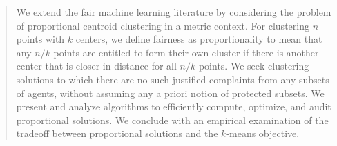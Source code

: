 \documentclass{article}
\begin{document}
\maketitle

\begin{abstract}We extend the fair machine learning literature by considering the problem of proportional centroid clustering in a metric context. For clustering $n$ points with $k$ centers, we define fairness as proportionality to mean that any $n/k$ points are entitled to form their own cluster if there is another center that is closer in distance for all $n/k$ points. We seek clustering solutions to which there are no such justified complaints from any subsets of agents, without assuming any a priori notion of protected subsets. We present and analyze algorithms to efficiently compute, optimize, and audit proportional solutions. We conclude with an empirical examination of the tradeoff between proportional solutions and the $k$-means objective. \end{abstract}


\end{document}

